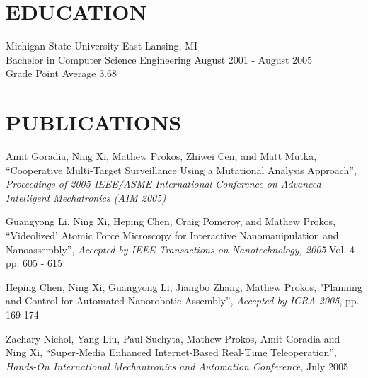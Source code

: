 \documentclass[line]{res}
\begin{document}
\begin{resume}
\section{EDUCATION} 
\vspace{1mm}
   Michigan State University \hfill East Lansing, MI\\
   Bachelor in Computer Science Engineering \hfill August 2001 - August 2005\\
   Grade Point Average 3.68\\


\section{PUBLICATIONS} 
\vspace{1mm}
   Amit Goradia, Ning Xi, Mathew Prokos, Zhiwei Cen, and Matt Mutka,
   ``Cooperative Multi-Target Surveillance Using a Mutational Analysis Approach'',
   \textsl{Proceedings of 2005 IEEE/ASME International Conference on
      Advanced Intelligent Mechatronics (AIM 2005)}

   \vspace{-2mm}
   Guangyong Li, Ning Xi, Heping Chen, Craig Pomeroy, and Mathew Prokos,
   ``Videolized' Atomic Force Microscopy for Interactive Nanomanipulation and Nanoassembly'',
   \textsl{Accepted by IEEE Transactions on Nanotechnology, 2005} Vol. 4 pp. 605 - 615

   \vspace{-2mm}
   Heping Chen, Ning Xi, Guangyong Li, Jiangbo Zhang, Mathew Prokos,
   "Planning and Control for Automated Nanorobotic Assembly'',
   \textsl{Accepted by ICRA 2005}, pp. 169-174

   \vspace{-2mm}
   Zachary Nichol, Yang Liu, Paul Suchyta, Mathew Prokos, Amit Goradia and Ning Xi, 
   ``Super-Media Enhanced Internet-Based Real-Time Teleoperation'',
   \textsl{Hands-On International Mechantronics and Automation Conference}, July 2005
\end{resume}
\end{document}
